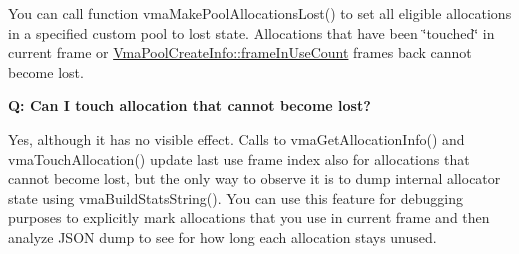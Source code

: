 You can call function vma\+Make\+Pool\+Allocations\+Lost() to set all eligible allocations in a specified custom pool to lost state. Allocations that have been \char`\"{}touched\char`\"{} in current frame or \hyperlink{structVmaPoolCreateInfo_a9437e43ffbb644dbbf7fc4e50cfad6aa}{Vma\+Pool\+Create\+Info\+::frame\+In\+Use\+Count} frames back cannot become lost.

{\bfseries Q\+: Can I touch allocation that cannot become lost?}

Yes, although it has no visible effect. Calls to vma\+Get\+Allocation\+Info() and vma\+Touch\+Allocation() update last use frame index also for allocations that cannot become lost, but the only way to observe it is to dump internal allocator state using vma\+Build\+Stats\+String(). You can use this feature for debugging purposes to explicitly mark allocations that you use in current frame and then analyze J\+S\+ON dump to see for how long each allocation stays unused. 